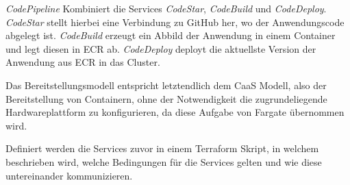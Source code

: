 \textit{\gls{CodePipeline}} Kombiniert die Services \textit{CodeStar}, \textit{CodeBuild} und \textit{CodeDeploy}. \textit{CodeStar} stellt hierbei eine Verbindung zu \gls{GitHub} her, wo der Anwendungscode abgelegt ist. \textit{CodeBuild} erzeugt ein Abbild der Anwendung in einem Container und legt diesen in \ac{ECR} ab. \textit{CodeDeploy} deployt die aktuellste Version der Anwendung aus \ac{ECR} in das Cluster.

Das Bereitstellungsmodell entspricht letztendlich dem \ac{CaaS} Modell, also der Bereitstellung von Containern, ohne der Notwendigkeit die zugrundeliegende Hardwareplattform zu konfigurieren, da diese Aufgabe von \gls{Fargate} übernommen wird.

Definiert werden die Services zuvor in einem \gls{Terraform} Skript, in welchem beschrieben wird, welche Bedingungen für die Services gelten und wie diese untereinander kommunizieren.